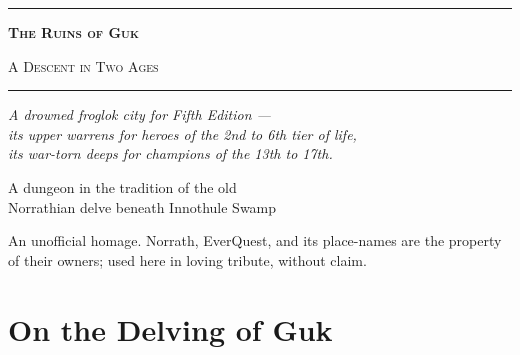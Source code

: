 \documentclass[10pt,twoside]{report}
\begin{document}
\pagestyle{empty}

\begin{titlepage}
\centering
\vspace*{\fill}
{\color{gukgold}\rule{0.7\linewidth}{1.5pt}}\par\vspace{10pt}
{\sffamily\bfseries\scshape\color{parch}\Huge The Ruins of Guk}\par\vspace{6pt}
{\sffamily\scshape\color{gukgold}\LARGE A Descent in Two Ages}\par\vspace{10pt}
{\color{gukgold}\rule{0.7\linewidth}{1.5pt}}\par\vspace{28pt}
{\itshape\color{parch}\large A drowned froglok city for Fifth Edition ---\\[2pt]
its upper warrens for heroes of the 2nd to 6th tier of life,\\[2pt]
its war-torn deeps for champions of the 13th to 17th.}\par
\vspace{40pt}
{\color{parch}\sffamily A dungeon in the tradition of the old\\ Norrathian delve beneath Innothule Swamp}\par
\vspace*{\fill}
{\footnotesize\color{gukbone}An unofficial homage. Norrath, EverQuest, and its place-names are the property of their owners; used here in loving tribute, without claim.}\par
\end{titlepage}

\clearpage
\pagestyle{fancy}
\setcounter{page}{1}
\setcounter{tocdepth}{1}
{\hypersetup{linkcolor=black}
\renewcommand{\contentsname}{\normalfont\sffamily\bfseries\scshape\color{gukdeep}The Delve, in Brief}
\tableofcontents}
\clearpage

\chapter*{On the Delving of Guk}
\end{document}
